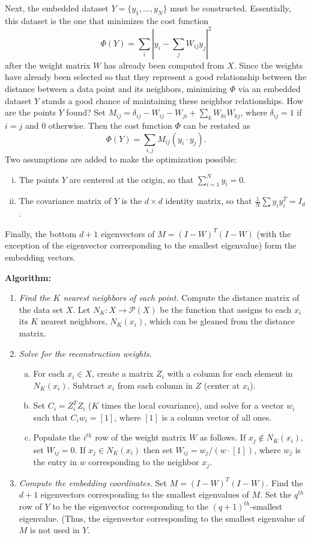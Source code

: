 \documentclass{gtpart}
\theoremstyle{definition}
\begin{document}
Next, the embedded dataset $Y = \{y_1, ..., y_N\}$ must be constructed. Essentially, this dataset is the one that minimizes the cost function $$\Phi(Y) = \sum_i \left| y_i - \sum_j W_{ij} y_j \right|^2$$ after the weight matrix $W$  has already been computed from $X$. Since the weights have already been selected so that they represent a good relationship between the distance between a data point and its neighbors, minimizing $\Phi$ via an embedded dataset $Y$ stands a good chance of maintaining these neighbor relationships. How are the points $Y$ found? Set $M_{ij} = \delta_{ij} - W_{ij} - W_{ji} + \sum_k W_{ki}W_{kj}$, where $\delta_{ij} =1$ if $i=j$ and 0 otherwise. Then the cost function $\Phi$ can be restated as $$\Phi(Y) = \sum_{i,j} M_{ij}(y_i \cdot y_j).$$ Two assumptions are added to make the optimization possible:
\begin{enumerate}[(i)]
\item The points $Y$ are centered at the origin, so that $\sum_{i=1}^N y_i = 0$.
\item The covariance matrix of $Y$ is the $d \times d$ identity matrix, so that $\frac{1}{N} \sum y_i y_i^T = I_d$.
\end{enumerate}
Finally, the bottom $d+1$ eigenvectors of $M = (I - W)^T(I - W)$ (with the exception of the eigenvector corresponding to the smallest eigenvalue) form the embedding vectors. 



{\bf Algorithm:}
\begin{enumerate}[(1)]
\item {\it Find the $K$ nearest neighbors of each point.} Compute the distance matrix of the data set $X$. Let $N_K:X \rightarrow \mathscr{P}(X)$ be the function that assigns to each $x_i$ its $K$ nearest neighbors, $N_K(x_i)$, which can be gleaned from the distance matrix.
\item {\it Solve for the reconstruction weights.} 
	\begin{enumerate}[(a)]
	\item For each $x_i \in X$, create a matrix $Z_i$ with a column for each element in $N_K(x_i)$. Subtract $x_i$ from each column in $Z$ (center at $x_i$). 
	\item Set $C_i = Z_i^T Z_i$ ($K$ times the local covariance), and solve for a vector $w_i$ such that $C_i w_i = [1]$, where $[1]$ is a column vector of all ones. 
	\item Populate the $i^{th}$ row of the weight matrix $W$ as follows. If $x_j \notin N_K(x_i)$, set $W_{ij} = 0$. If $x_j \in N_K(x_i)$ then set $W_{ij} = w_j/(w \cdot [1])$, where $w_j$ is the entry in $w$ corresponding to the neighbor $x_j$.
	\end{enumerate}
\item {\it Compute the embedding coordinates.} Set $M = (I - W)^T(I - W)$. Find the $d + 1$ eigenvectors corresponding to the smallest eigenvalues of $M$. Set the $q^{th}$ row of $Y$ to be the eigenvector corresponding to the $(q+1)^{th}$-smallest eigenvalue. (Thus, the eigenvector corresponding to the smallest eigenvalue of $M$ is not used in $Y$.
\end{enumerate}
\end{document}
